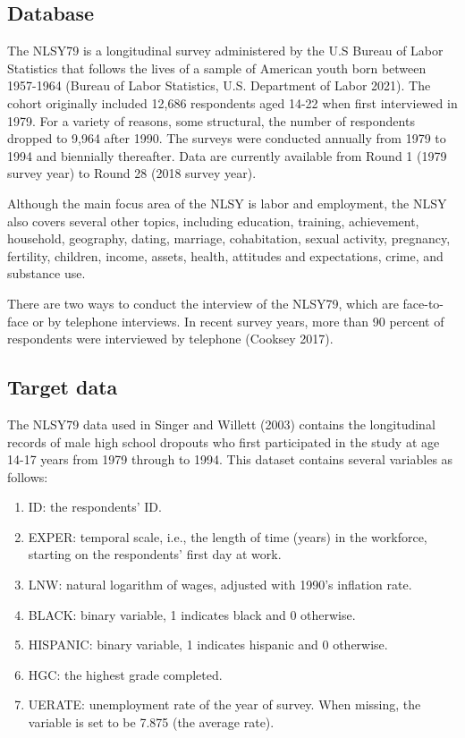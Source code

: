 \documentclass{article}
\providecommand{\tightlist}{%
  \setlength{\itemsep}{0pt}\setlength{\parskip}{0pt}}
\begin{document}
\hypertarget{database-1}{%
\subsection{Database}\label{database-1}}

The NLSY79 is a longitudinal survey administered by the U.S Bureau of Labor Statistics that follows the lives of a sample of American youth born between 1957-1964 (Bureau of Labor Statistics, U.S. Department of Labor 2021). The cohort originally included 12,686 respondents aged 14-22 when first interviewed in 1979. For a variety of reasons, some structural, the number of respondents dropped to 9,964 after 1990. The surveys were conducted annually from 1979 to 1994 and biennially thereafter. Data are currently available from Round 1 (1979 survey year) to Round 28 (2018 survey year).

Although the main focus area of the NLSY is labor and employment, the NLSY also covers several other topics, including education, training, achievement, household, geography, dating, marriage, cohabitation, sexual activity, pregnancy, fertility, children, income, assets, health, attitudes and expectations, crime, and substance use.

There are two ways to conduct the interview of the NLSY79, which are face-to-face or by telephone interviews. In recent survey years, more than 90 percent of respondents were interviewed by telephone (Cooksey 2017).

\hypertarget{target}{%
\subsection{Target data}\label{target}}

The NLSY79 data used in Singer and Willett (2003) contains the longitudinal records of male high school dropouts who first participated in the study at age 14-17 years from 1979 through to 1994. This dataset contains several variables as follows:

\begin{enumerate}
\def\labelenumi{\arabic{enumi}.}
\tightlist
\item
  ID: the respondents' ID.
\item
  EXPER: temporal scale, i.e., the length of time (years) in the workforce, starting on the respondents' first day at work.
\item
  LNW: natural logarithm of wages, adjusted with 1990's inflation rate.
\item
  BLACK: binary variable, 1 indicates black and 0 otherwise.
\item
  HISPANIC: binary variable, 1 indicates hispanic and 0 otherwise.
\item
  HGC: the highest grade completed.
\item
  UERATE: unemployment rate of the year of survey. When missing, the variable is set to be 7.875 (the average rate).
\end{enumerate}
\end{document}
